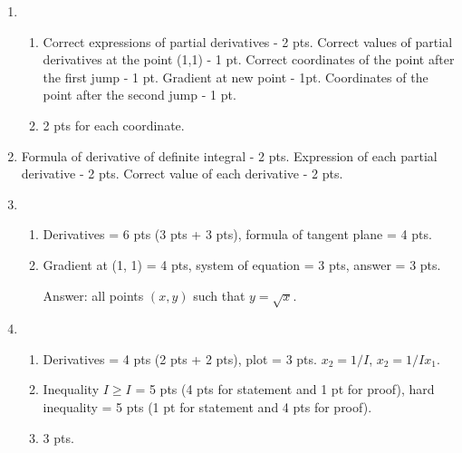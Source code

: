 \begin{enumerate}
 \item
   \begin{enumerate}
     \item  Correct expressions of partial derivatives - 2 pts.
      Correct values of partial derivatives at the point (1,1) - 1 pt.
      Correct coordinates of the point after the first jump - 1 pt. Gradient at new point
      - 1pt. Coordinates of the point after the second jump - 1 pt.
     \item 2 pts for each coordinate.
   \end{enumerate}

 \item
 Formula of derivative of definite integral - 2 pts.
 Expression of each partial derivative - 2 pts.
 Correct value of each derivative - 2 pts.

 \item
 \begin{enumerate}
   \item Derivatives = 6 pts (3 pts + 3 pts), formula of tangent plane = 4 pts.
   \item Gradient at (1, 1) = 4 pts, system of equation = 3 pts, answer = 3 pts.

   Answer: all points $(x, y)$ such that $y=\sqrt{x}$.
 \end{enumerate}
  \item


  \begin{enumerate}
    \item Derivatives = 4 pts (2 pts + 2 pts), plot = 3 pts. $x_2=1/I$, $x_2=1/Ix_1$.
    \item Inequality $I \geq I$ = 5 pts (4 pts for statement and 1 pt for proof),
    hard inequality = 5 pts (1 pt for statement and 4 pts for proof).
    \item 3 pts.
  \end{enumerate}

\end{enumerate}
